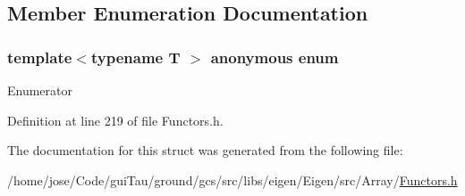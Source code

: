 \subsection{Member Enumeration Documentation}
\hypertarget{structei__functor__traits_3_01std_1_1plus_3_01_t_01_4_01_4_a9a15423a82619503488f5c34ee301ca6}{\subsubsection[{anonymous enum}]{\setlength{\rightskip}{0pt plus 5cm}template$<$typename T $>$ anonymous enum}}\label{structei__functor__traits_3_01std_1_1plus_3_01_t_01_4_01_4_a9a15423a82619503488f5c34ee301ca6}
\begin{Desc}
\item[Enumerator]\par
\begin{description}
\item[{\em 
\hypertarget{structei__functor__traits_3_01std_1_1plus_3_01_t_01_4_01_4_a9a15423a82619503488f5c34ee301ca6aa42e35c8e233374cc23b8823628b2560}{Cost}\label{structei__functor__traits_3_01std_1_1plus_3_01_t_01_4_01_4_a9a15423a82619503488f5c34ee301ca6aa42e35c8e233374cc23b8823628b2560}
}]\item[{\em 
\hypertarget{structei__functor__traits_3_01std_1_1plus_3_01_t_01_4_01_4_a9a15423a82619503488f5c34ee301ca6a5c0c61fd6457de72c1fd2b722ddd8954}{Packet\-Access}\label{structei__functor__traits_3_01std_1_1plus_3_01_t_01_4_01_4_a9a15423a82619503488f5c34ee301ca6a5c0c61fd6457de72c1fd2b722ddd8954}
}]\end{description}
\end{Desc}


Definition at line 219 of file Functors.\-h.



The documentation for this struct was generated from the following file\-:\begin{DoxyCompactItemize}
\item 
/home/jose/\-Code/gui\-Tau/ground/gcs/src/libs/eigen/\-Eigen/src/\-Array/\hyperlink{_array_2_functors_8h}{Functors.\-h}\end{DoxyCompactItemize}
